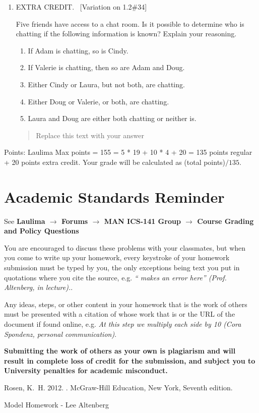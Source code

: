 \documentclass[10pt]{article}
\newcommand{\Answer}[1]{\begin{quote}{\color{blue}#1}\end{quote}}
\begin{document}
\begin{enumerate}
\begin{enumerate}
\end{enumerate}

\item EXTRA CREDIT.   \ [Variation on 1.2\#34] 

Five friends have access to a chat room. Is it possible to determine who is chatting if the following information is known? Explain your reasoning.
\begin{enumerate}
\item If Adam is chatting, so is Cindy. 
\item If Valerie is chatting, then so are Adam and Doug. 
\item Either Cindy or Laura, but not both, are chatting. 
\item Either Doug or Valerie, or both, are chatting.
\item Laura and Doug are either both chatting or neither is. 
\end{enumerate}
\qquad [20 points]
\Answer{Replace this text with your answer}

\end{enumerate}	%

Points: Laulima Max points = 155 = 5 * 19 + 10 * 4 + 20  = 135 points regular + 20 points extra credit.  Your grade will be calculated as (total points)$/135$.

\section*{Academic Standards Reminder}
See {\bf Laulima $\rightarrow$ Forums $\rightarrow$  MAN ICS-141 Group $\rightarrow$  Course Grading and Policy Questions }

You are encouraged to discuss these problems with your classmates, but when you come to write up your homework, every keystroke of your homework submission must be typed by you, the only exceptions being text you put in quotations where you cite the source, e.g. \emph{``\citet{Rosen:2012:Discrete} makes an error here'' (Prof. Altenberg, in lecture).}.

Any ideas, steps, or other content in your homework that is the work of others must be presented with a citation of whose work that is or the URL of the document if found online, e.g. \emph{At this step we multiply each side by 10 (Cora Spondenz, personal communication)}.

{\bf Submitting the work of others as your own is plagiarism and will result in complete loss of credit for the submission, and subject you to University penalties for academic misconduct.}


\begin{thebibliography}{}

Rosen, K.~H. 2012.
.
\newblock McGraw-Hill Education, New York, {Seventh} edition.

Model Homework - Lee Altenberg

\end{thebibliography}
\end{document}
